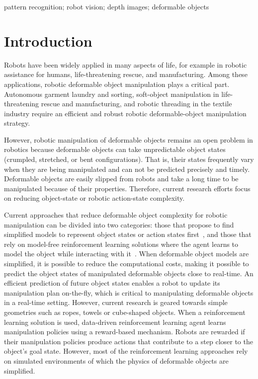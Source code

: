 \documentclass[conference]{IEEEtran}
\begin{document}
\begin{IEEEkeywords}
pattern recognition; robot vision; depth images; deformable objects
\end{IEEEkeywords}

\section{Introduction \label{sec:introduction}}
Robots have been widely applied in many aspects of life, for example in robotic assistance for humans, life-threatening rescue, and manufacturing. Among these applications, robotic deformable object manipulation plays a critical part. Autonomous garment laundry and sorting, soft-object manipulation in life-threatening rescue and manufacturing, and robotic threading in the textile industry require an efficient and robust robotic deformable-object manipulation strategy. 

However, robotic manipulation of deformable objects remains an open problem in robotics because deformable objects can take unpredictable object states (crumpled, stretched, or bent configurations). That is, their states frequently vary when they are being manipulated and can not be predicted precisely and timely. Deformable objects are easily slipped from robots and take a long time to be manipulated because of their properties. Therefore, current research efforts focus on reducing object-state or robotic action-state complexity.

Current approaches that reduce deformable object complexity for robotic manipulation can be divided into two categories: those that propose to find simplified models to represent object states or action states first~\cite{yan2020learning,li2015folding,10.1145/182478.182583,zaidi2017model,7139370,8255664}, and those that rely on model-free reinforcement learning solutions where the agent learns to model the object while interacting with it~\cite{pignat2017learning,schulman2016learning,balaguer2011combining}. When deformable object models are simplified, it is possible to reduce the computational costs, making it possible to predict the object states of manipulated deformable objects close to real-time. An efficient prediction of future object states enables a robot to update its manipulation plan on-the-fly, which is critical to manipulating deformable objects in a real-time setting. However, current research is geared towards simple geometries such as ropes, towels or cube-shaped objects. When a reinforcement learning solution is used, data-driven reinforcement learning agent learns manipulation policies using a reward-based mechanism. Robots are rewarded if their manipulation policies produce actions that contribute to a step closer to the object's goal state. However, most of the reinforcement learning approaches rely on simulated environments of which the physics of deformable objects are simplified.
\end{document}
